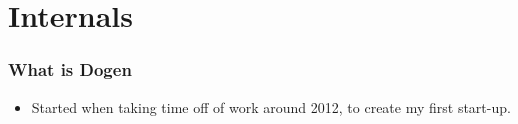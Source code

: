\documentclass{beamer}
\begin{document}
\section{Internals}

\begin{frame}
\frametitle{What is Dogen}

\begin{itemize}

\item Started when taking time off of work around 2012, to create my
  first start-up.

\end{itemize}

\end{frame}

\end{document}
